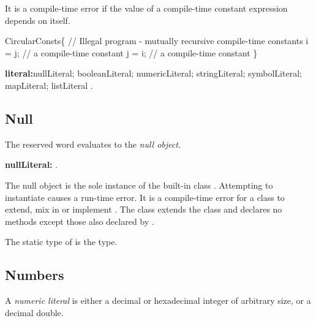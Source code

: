 \documentclass{article}
\begin{document}

\LMHash{}
It is a compile-time error if the value of a compile-time constant expression depends on itself.


\begin{dartCode}
\CLASS{} CircularConsts\{
// Illegal program - mutually recursive compile-time constants
  \STATIC{} \CONST{} i = j; // a compile-time constant
  \STATIC{} \CONST{} j = i; // a compile-time constant
\}
\end{dartCode}

\begin{grammar}
{\bf literal:}nullLiteral;
  booleanLiteral;
  numericLiteral;
  stringLiteral;
  symbolLiteral;
  mapLiteral;
  listLiteral
  .
\end{grammar}


\subsection{Null}

\LMHash{}
The reserved word \NULL{} evaluates to the {\em null object}.

\begin{grammar}
{\bf nullLiteral:}\NULL{}
  .
\end{grammar}

\LMHash{}
The null object is the sole instance of the built-in class .
Attempting to instantiate  causes a run-time error.
It is a compile-time error for a class to extend, mix in or implement .
The  class extends the  class and declares no methods except those also declared by .

\LMHash{}
The static type of \NULL{} is the  type.


\subsection{Numbers}

\LMHash{}
A {\em numeric literal} is either a decimal or hexadecimal integer of arbitrary size, or a decimal double.
\end{document}
